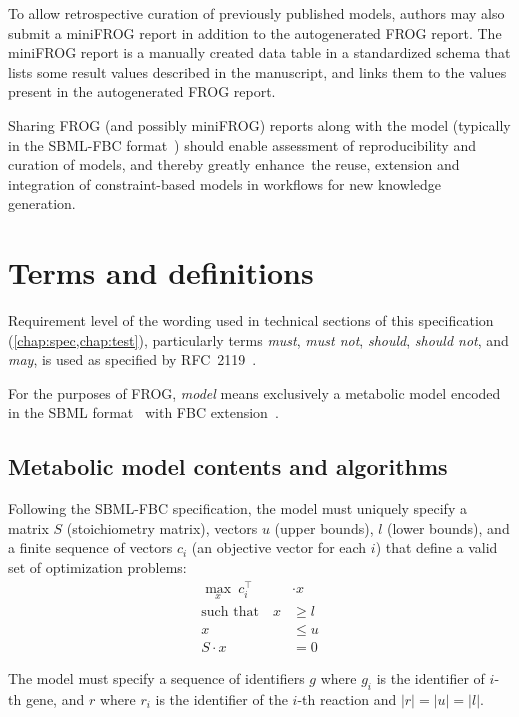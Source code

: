 To allow retrospective curation of previously published models, authors may also submit a miniFROG report in addition to the autogenerated FROG report. The miniFROG report is a manually created data table in a standardized schema that lists some result values described in the manuscript, and links them to the values present in the autogenerated FROG report.

Sharing FROG (and possibly miniFROG) reports along with the model (typically in the SBML-FBC format~\cite{olivier2018sbmlfbc}) should enable assessment of reproducibility and curation of models, and thereby greatly enhance the reuse, extension and integration of constraint-based models in workflows for new knowledge generation. 

\section{Terms and definitions}

Requirement level of the wording used in technical sections of this specification (\cref{chap:spec,chap:test}), particularly terms \emph{must}, \emph{must not}, \emph{should}, \emph{should not}, and \emph{may}, is used as specified by RFC~2119~\cite{rfc2119}.

For the purposes of FROG, \emph{model} means exclusively a metabolic model encoded in the SBML format~\cite{hucka2003systems,keating2020sbml} with FBC extension~\cite{olivier2018sbmlfbc}.


\subsection{Metabolic model contents and algorithms}
\label{sec:algos}

Following the SBML-FBC specification, the model must uniquely specify a matrix $S$ (stoichiometry matrix), vectors $u$ (upper bounds), $l$ (lower bounds), and a finite sequence of vectors $c_i$ (an objective vector for each $i$) that define a valid set of optimization problems:
\begin{align*}
\max_x\ c_i^\intercal &\cdot x \\
\text{such that}\quad
x & \geq l \\
x & \leq u \\
S\cdot x &= 0
\end{align*}

The model must specify a sequence of identifiers $g$ where $g_i$ is the identifier of $i$-th gene, and $r$ where $r_i$ is the identifier of the $i$-th reaction and $|r| = |u| = |l|$.

